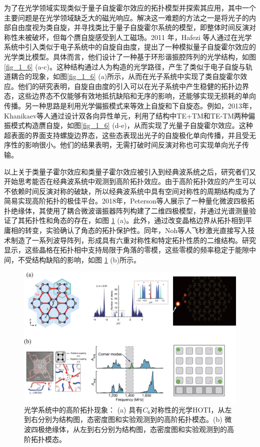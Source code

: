 为了在光学领域实现类似于量子自旋霍尔效应的拓扑模型并探索其应用，其中一个主要问题是在光学领域缺乏大的磁光响应。解决这一难题的方法之一是将光子的内部自由度视为类自旋，并寻找类比于量子自旋霍尔系统的模型，即整体时间反演对称性未被破坏，但每个赝自旋感受到人工磁场。2011 年，Hafezi 等人通过在光学系统中引入类似于电子系统中的自旋自由度，提出了一种模拟量子自旋霍尔效应的光学类比模型\cite{g3,g6}。具体而言，他们设计了一种基于环形谐振腔阵列的光学结构，如图 \ref{fig_1_6} (a-c)。这种结构通过人为构造的光学路径，产生了类似于电子自旋与轨道耦合的现象，如图\ref{fig_1_6} (a)所示，从而在光子系统中实现了类自旋霍尔效应。他们的研究表明，自旋自由度的引入可以在光子系统中产生稳健的拓扑边界态，这些边界态不仅能够有效地抵抗缺陷和无序的影响，还能够实现无损耗的单向传播。另一种思路是利用光学偏振模式来等效上自旋和下自旋态。例如，2013年，Khanikaev等人通过设计双各向异性单元，利用了结构中TE+TM和TE-TM两种偏振模式构造赝自旋，如图\ref{fig_1_6} (d-e)，从而实现了光量子自旋霍尔效应\cite{g-add-1}。这种超表面的界面支持螺旋边界态，这些态表现出光子的自旋极化单向传播，并且受无序性的影响很小。他们的结果表明，无需打破时间反演对称也可实现单向光子传输。

以上关于类量子霍尔效应和类量子霍尔效应被引入到经典波系统之后，研究者们又开始思考能否在经典波系统中观测到高阶拓扑效应。由于高阶拓扑效应的产生可以不依赖时间反演对称的破缺，所以经典波系统中具有空间对称性的周期结构成为了简易实现高阶拓扑的极佳平台。2018年，Peterson等人展示了一种量化微波四极拓扑绝缘体\cite{h5}，其使用了耦合微波谐振器阵列构建了二维四极模型，并通过光谱测量验证了其拓扑性和角态的存在，如图 \ref{fig_1_7} (a)。此外，通过改变晶格边界从拓扑相到平庸相的转变，实验确认了角态的拓扑保护性。同年，Noh等人飞秒激光直接写入技术制造了一系列波导阵列，形成具有六重对称性和特定拓扑性质的二维结构\cite{h6}。研究显示，这些晶格在拓扑相中支持局限于角落的零模，这些零模的频率稳定于能隙中间，不受结构缺陷的影响，如图 \ref{fig_1_7} (b)所示。

\begin{figure}[h!]
    \centering
    \includegraphics[width=1\textwidth]{images/fig1-7.eps} 
    \caption{光学系统中的高阶拓扑现象：
    (a) 具有$C_6$对称性的光学HOTI\cite{h5}，从左到右分别为结构图，态密度图和实验观测到的高阶拓扑模态。(b) 微波四极绝缘体\cite{h6}，从左到右分别为结构图，态密度图和实验观测到的高阶拓扑模态。
    }
    \label{fig_1_7}
\end{figure}

